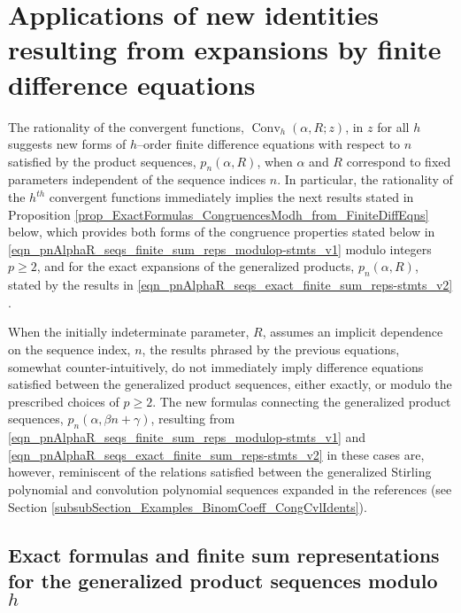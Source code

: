 \documentclass[12pt,reqno]{article}
\numberwithin{sfootnote}{section}
\numberwithin{equation}{section}
\theoremstyle{DefaultTheoremStyle}
\theoremstyle{definition}
\newcommand{\cf}[0]{cf.\ }
\newcommand{\pn}[3]{\ensuremath{p_{#1}\left(#2, #3\right)}}
\newcommand{\ConvGF}[4]{\ensuremath{\Conv_{#1}\left(#2, #3; #4\right)}}
\DeclareMathOperator{\Conv}{Conv}
\begin{document}
\section{Applications of new identities resulting from expansions by 
         finite difference equations} 
\label{subSection_FiniteDiffEqns_for_the_GenFactFns} 

The rationality of the convergent functions, $\ConvGF{h}{\alpha}{R}{z}$, in 
$z$ for all $h$ suggests new forms of $h$--order finite difference equations 
with respect to $n$ satisfied by the product sequences, $p_n(\alpha, R)$, 
when $\alpha$ and $R$ correspond to fixed parameters independent of the 
sequence indices $n$. 
In particular, the 
rationality of the $h^{th}$ convergent functions immediately 
implies the next results stated in 
Proposition \ref{prop_ExactFormulas_CongruencesModh_from_FiniteDiffEqns} 
below, which provides both forms of the congruence properties stated below in 
\eqref{eqn_pnAlphaR_seqs_finite_sum_reps_modulop-stmts_v1} modulo 
integers $p \geq 2$, and for the exact expansions of the 
generalized products, $p_n(\alpha, R)$, stated by the results in 
\eqref{eqn_pnAlphaR_seqs_exact_finite_sum_reps-stmts_v2} 
\citep[\S 2.3]{GFLECT} \citep[\S 7.2]{GKP}. 

When the initially indeterminate parameter, $R$, 
assumes an implicit dependence on the sequence index, $n$, the 
results phrased by the previous equations, 
somewhat counter-intuitively, do not immediately imply difference equations 
satisfied between the generalized product sequences, 
either exactly, or modulo the prescribed choices of $p \geq 2$. 
The new formulas connecting the generalized product sequences, 
$\pn{n}{\alpha}{\beta n + \gamma}$, resulting from 
\eqref{eqn_pnAlphaR_seqs_finite_sum_reps_modulop-stmts_v1} and 
\eqref{eqn_pnAlphaR_seqs_exact_finite_sum_reps-stmts_v2} 
in these cases are, however, reminiscent of the relations satisfied 
between the generalized Stirling polynomial and 
convolution polynomial sequences expanded in the references 
\citep{CVLPOLYS,MULTIFACTJIS} \citep[\cf \S 6.2]{GKP} 
(see Section \ref{subsubSection_Examples_BinomCoeff_CongCvlIdents}). 

\subsection{Exact formulas and finite sum representations for the 
            generalized product sequences modulo $h$} 
\label{subSection_FiniteDiffEqns_for_the_GenFactFns-ExactFormulas_Stmts} 
\end{document}
